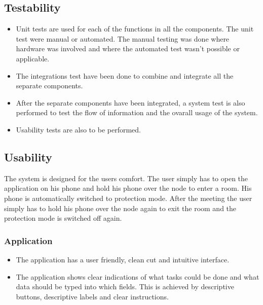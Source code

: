 \subsection{Testability}
\begin{itemize}
\item Unit tests are used for each of the functions in all the components. The unit test were manual or automated. The manual testing was done where hardware was involved and where the automated test wasn't possible or applicable.
\item The integrations test have been done to combine and integrate all the separate components. %
\item After the separate components have been integrated, a system test is also performed to test the flow of information and the ovarall usage of the system.
\item Usability tests are also to be performed.
\end{itemize}

\subsection{Usability}
The system is designed for the users comfort. The user simply has to open the application on his phone and hold his phone over the node to enter a room. His phone is automatically switched to protection mode. After the meeting the user simply has to hold his phone over the node again to exit the room and the protection mode is switched off again. 
\subsubsection{Application}
\begin{itemize}
\item The application has a user friendly, clean cut and intuitive interface. 
\item The application shows clear indications of what tasks could be done and what data should be typed into which fields. This is achieved by descriptive buttons, descriptive labels and clear instructions.
\end{itemize}

